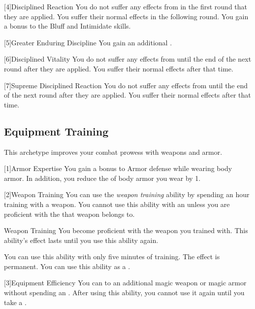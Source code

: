         [4]{Disciplined Reaction}
        You do not suffer any effects from  in the first round that they are applied.
        You suffer their normal effects in the following round.
        You gain a  bonus to the Bluff and Intimidate skills.

        [5]{Greater Enduring Discipline}
        You gain an additional .

        [6]{Disciplined Vitality}
        You do not suffer any effects from  until the end of the next round after they are applied.
        You suffer their normal effects after that time.

        [7]{Supreme Disciplined Reaction}
        You do not suffer any effects from  until the end of the next round after they are applied.
        You suffer their normal effects after that time.

    \subsection{Equipment Training}
        This archetype improves your combat prowess with weapons and armor.

        [1]{Armor Expertise}
        You gain a  bonus to Armor defense while wearing body armor.
        In addition, you reduce the  of body armor you wear by 1.

        [2]{Weapon Training} You can use the \textit{weapon training} ability by spending an hour training with a weapon.
        You cannot use this ability with an  unless you are proficient with the  that weapon belongs to.
        \begin{freeability}{Weapon Training}
            You become proficient with the weapon you trained with.
            This ability's effect lasts until you use this ability again.

            \rankline
             You can use this ability with only five minutes of training.
             The effect is permanent.
             You can use this ability as a .
        \end{freeability}

        [3]{Equipment Efficiency} You can  to an additional magic weapon or magic armor without spending an .
        After using this ability, you cannot use it again until you take a .

